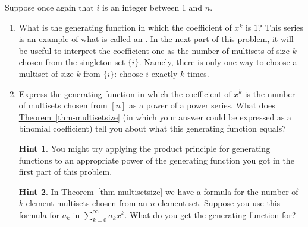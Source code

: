 \documentclass{book}
\begin{document}
\setcounter{cpjt}{250}
\addtocounter{cpjt}{-1}
\begin{activity}\label{activity-243}
\hypertarget{p-1304}{}%
Suppose once again that \(i\) is an integer between 1 and \(n\).%
\begin{enumerate}[font=\bfseries,label=(\alph*),ref=\alph*]
\item\label{task-242} \hypertarget{p-1305}{}%
What is the generating function in which the coefficient of \(x^k\) is \(1\)? This series is an example of what is called an . In the next part of this problem, it will be useful to interpret the coefficient one as the number of multisets of size \(k\) chosen from the singleton set \(\{i\}\). Namely, there is only one way to choose a multiset of size \(k\) from \(\{i\}\): choose \(i\) exactly \(k\) times.%
\par\smallskip%
\noindent\item\label{task-243} \hypertarget{p-1307}{}%
Express the generating function in which the coefficient of \(x^k\) is the number of multisets chosen from \([n]\) as a power of a power series.  What does \hyperref[thm-multisetsize]{Theorem~\ref{thm-multisetsize}} (in which your answer could be expressed as a binomial coefficient) tell you about what this generating function equals?%
\par\smallskip%
\noindent\textbf{Hint 1}.\hypertarget{hint-159}{}\quad%
\hypertarget{p-1308}{}%
You might try applying the product principle for generating functions to an appropriate power of the generating function you got in the first part of this problem.%
\par\smallskip%
\noindent\textbf{Hint 2}.\hypertarget{hint-160}{}\quad%
\hypertarget{p-1309}{}%
In \hyperref[thm-multisetsize]{Theorem~\ref{thm-multisetsize}} we have a formula for the number of \(k\)-element multisets chosen from an \(n\)-element set. Suppose you use this formula for \(a_k\) in \(\sum_{k=0}^\infty a_kx^k\). What do you get the generating function for?%
\par\smallskip%
\noindent\end{enumerate}
\end{activity}

\clearpage
\end{document}
